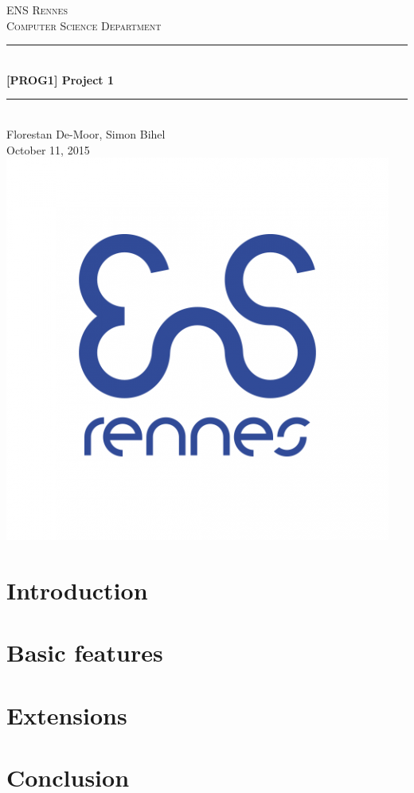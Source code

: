 \documentclass[12pt]{article}
\begin{document}
\begin{titlepage}
	
	\newcommand{\HRule}{\rule{\linewidth}{0.5mm}} %
	\center
	
	\textsc{\LARGE ENS Rennes}\\[1.5cm]
	\textsc{\Large Computer Science Department}\\[0.5cm]
	
	\HRule \\[0.4cm]
		{ \huge \bfseries [PROG1] Project 1}\\[0.4cm]
	\HRule \\[1.5cm]
	
	{\large Florestan De-Moor, Simon Bihel}\\[2cm]
	
	{\large October 11, 2015}\\[2cm]
	
	\includegraphics[scale=0.3]{ENS_Rennes.png}\\[1cm]
	\vfill
\end{titlepage}


\section{Introduction}

\section{Basic features}

\section{Extensions}

\section{Conclusion}
\end{document}

